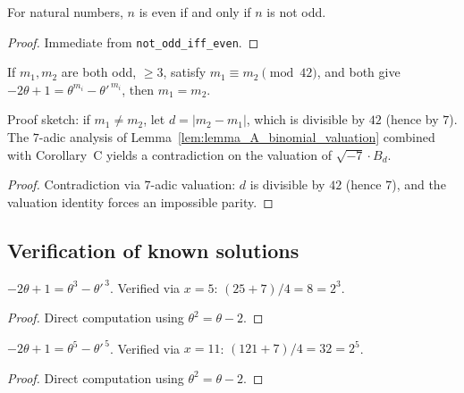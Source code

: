 \begin{lemma}
  \label{lem:nat_even_iff_not_odd}
  \leanok
  For natural numbers, $n$ is even if and only if $n$ is not odd.
\end{lemma}
\begin{proof}\leanok
  Immediate from \texttt{not\_odd\_iff\_even}.
\end{proof}

\begin{lemma}
  \label{lem:at_most_one_m_per_class}
  \leanok
  If $m_1, m_2$ are both odd, $\geq 3$, satisfy $m_1 \equiv m_2 \pmod{42}$,
  and both give $-2\theta + 1 = \theta^{m_i} - \theta'^{\,m_i}$, then $m_1 = m_2$.

  Proof sketch: if $m_1 \neq m_2$, let $d = |m_2 - m_1|$, which is divisible by $42$
  (hence by $7$). The $7$-adic analysis of Lemma~\ref{lem:lemma_A_binomial_valuation} combined
  with Corollary~C yields a contradiction on the valuation of $\sqrt{-7} \cdot B_d$.
\end{lemma}
\begin{proof}\leanok
  Contradiction via $7$-adic valuation: $d$ is divisible by $42$ (hence $7$),
  and the valuation identity forces an impossible parity.
\end{proof}

\subsection{Verification of known solutions}

\begin{lemma}[Verification: $m = 3$ (i.e.\ $n = 5$)]
  \label{lem:theta_eq_at_3}
  \leanok
  $-2\theta + 1 = \theta^3 - \theta'^{\,3}$.
  Verified via $x = 5$: $(25 + 7)/4 = 8 = 2^3$.
\end{lemma}
\begin{proof}\leanok
  Direct computation using $\theta^2 = \theta - 2$.
\end{proof}

\begin{lemma}[Verification: $m = 5$ (i.e.\ $n = 7$)]
  \label{lem:theta_eq_at_5}
  \leanok
  $-2\theta + 1 = \theta^5 - \theta'^{\,5}$.
  Verified via $x = 11$: $(121 + 7)/4 = 32 = 2^5$.
\end{lemma}
\begin{proof}\leanok
  Direct computation using $\theta^2 = \theta - 2$.
\end{proof}

